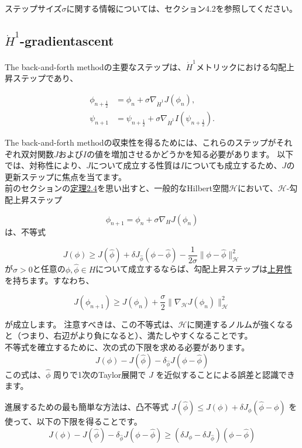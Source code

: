 \documentclass{jsarticle}
\theoremstyle{definition}
\begin{document}
ステップサイズ$\sigma$に関する情報については、セクション4.2を参照してください。


\subsection{$\dot{H}^1$-gradientascent}

The back-and-forth methodの主要なステップは、$\dot{H}^1$メトリックにおける勾配上昇ステップであり、

\begin{align*}
\phi_{n + \frac{1}{2}} &= \phi_n + \sigma \nabla_{\dot{H}^1} J(\phi_n), \\
\psi_{n + 1} &= \psi_{n + \frac{1}{2}} + \sigma \nabla_{\dot{H}^1} I(\psi_{n + \frac{1}{2}}).
\end{align*}

The back-and-forth methodの収束性を得るためには、これらのステップがそれぞれ双対関数$J$および$I$の値を増加させるかどうかを知る必要があります。
以下では、対称性により、$J$について成立する性質は$I$についても成立するため、$J$の更新ステップに焦点を当てます。\\



前のセクションの\hyperlink{定理2.4}{定理2.4}を思い出すと、一般的なHilbert空間$\mathcal{H} $において、$\mathcal{H}$-勾配上昇ステップ

$$\phi_{n+1}=\phi_n+\sigma\nabla_H J(\phi_n)$$
は、不等式

\begin{equation}
  J(\phi)\geq J(\hat{\phi})+\delta J _{\hat{\phi}}(\phi-\hat{\phi})-\frac{1}{2\sigma}\|\phi-\hat{\phi}\|_{\mathcal{H}}^2
\end{equation}
が$\sigma>0$と任意の$\phi,\hat{\phi}\in H$について成立するならば、勾配上昇ステップは\hyperlink{上昇性}{上昇性}を持ちます。すなわち、

$$
J(\phi_{n+1})\geq J(\phi_n) + \frac{\sigma}{2}\|\nabla_\mathcal{H}  J(\phi_n)\|_\mathcal{H}^2
$$

が成立します。
注意すべきは、この不等式は、$\mathcal{H} $に関連するノルムが強くなると（つまり、右辺がより負になると）、満たしやすくなることです。\\


不等式を確立するために、次の式の下限を求める必要があります。
$$
J(\phi) - J(\hat{\phi}) - \delta_{\hat{\phi}} J (\phi - \hat{\phi})
$$
この式は、$\hat{\phi}$ 周りで1次のTaylor展開で $J$ を近似することによる誤差と認識できます。

{\color{teal}
進展するための最も簡単な方法は、凸不等式 $J(\hat{\phi}) \le J(\phi) + \delta J_{\phi}(\hat{\phi} - \phi)$ を使って、以下の下限を得ることです。}
$$
J(\phi) - J(\hat{\phi}) - \delta_{\hat{\phi}} J(\phi-\hat{\phi}) \ge (\delta J_{\phi} - \delta J_{\hat{\phi}}) (\phi - \hat{\phi})
$$
\end{document}
